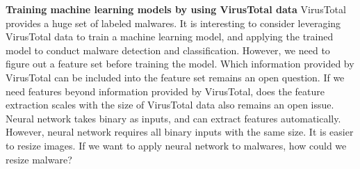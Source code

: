 {\bf Training machine learning models by using VirusTotal data}
VirusTotal provides a huge set of labeled malwares. 
It is interesting to consider leveraging VirusTotal data to train a machine learning model, and applying the trained model to conduct malware detection and classification. 
However, we need to figure out a feature set before training the model. 
Which information provided by VirusTotal can be included into the feature set remains an open question. If we need features beyond information provided by VirusTotal, does the feature extraction scales with the size of VirusTotal data also remains an open issue. 
Neural network takes binary as inputs, and can extract features automatically. 
However, neural network requires all binary inputs with the same size. It is easier to resize images. If we want to apply neural network to malwares, how could we resize malware? 